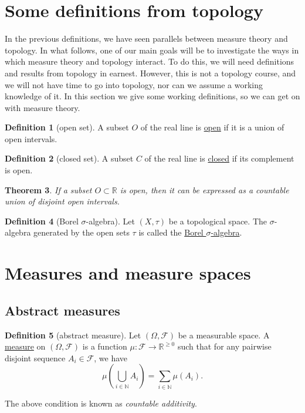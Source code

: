 \documentclass[a4paper,12pt]{scrreprt}
\newcommand{\R}{\mathbb{R}}
\newcommand{\N}{\mathbb{N}}
\newcommand{\defn}[1]{\ul{#1}}
\theoremstyle{definition}
\newtheorem{definition}{Definition}
\theoremstyle{plain}
\newtheorem{theorem}[definition]{Theorem}
\theoremstyle{remark}
\begin{document}
\section{Some definitions from topology}
In the previous definitions, we have seen parallels between measure theory and topology. In what follows, one of our main goals will be to investigate the ways in which measure theory and topology interact. To do this, we will need definitions and results from topology in earnest. However, this is not a topology course, and we will not have time to go into topology, nor can we assume a working knowledge of it. In this section we give some working definitions, so we can get on with measure theory.

\begin{definition}[open set]
  \label{def:openset}
  A subset $O$ of the real line is \defn{open} if it is a union of open intervals.
\end{definition}

\begin{definition}[closed set]
  \label{def:closedset}
  A subset $C$ of the real line is \defn{closed} if its complement is open.
\end{definition}

\begin{theorem}
  If a subset $O \subset \R$ is open, then it can be expressed as a countable union of disjoint open intervals.
\end{theorem}

\begin{definition}[Borel $\sigma$-algebra]
  \label{def:borelsigmaalgebra}
  Let $(X, \tau)$ be a topological space. The $\sigma$-algebra generated by the open sets $\tau$ is called the \defn{Borel $\sigma$-algebra}.
\end{definition}

\section{Measures and measure spaces}
\subsection{Abstract measures}
\begin{definition}[abstract measure]
  \label{def:abstractmeasure}
  Let $(\Omega, \mathcal{F})$ be a measurable space. A \defn{measure} on $(\Omega, \mathcal{F})$ is a function $\mu\colon \mathcal{F} \to \R^{\geq 0}$ such that for any pairwise disjoint sequence $A_{i} \in \mathcal{F}$, we have
  \begin{equation*}
    \mu\left( \bigcup_{i \in \N} A_{i} \right) = \sum_{i \in \N} \mu(A_{i}).
  \end{equation*}

  The above condition is known as \emph{countable additivity}.
\end{definition}
\end{document}
